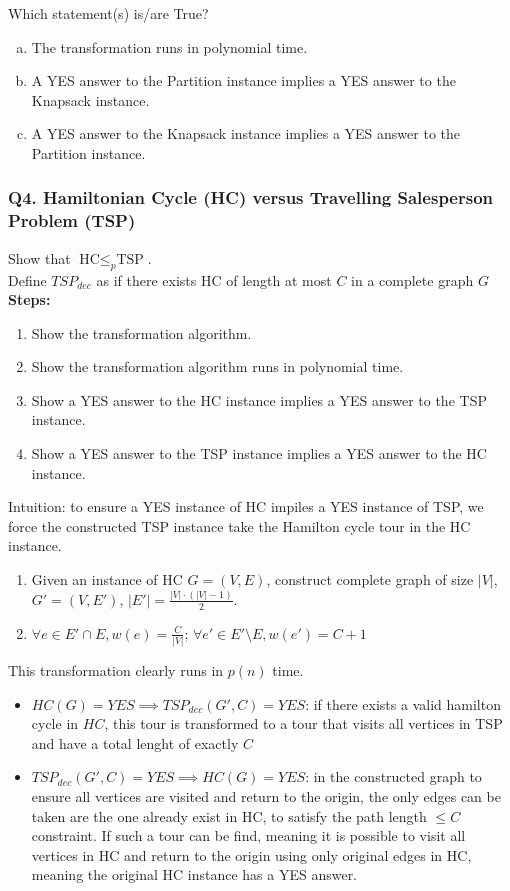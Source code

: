 \documentclass[9pt]{extarticle}
\begin{document}
Which statement(s) is/are True?
\begin{enumerate}[(a)]
    \item The transformation runs in polynomial time.
    \item A YES answer to the Partition instance implies a YES answer to the Knapsack instance.
    \item A YES answer to the Knapsack instance implies a YES answer to the Partition instance.
\end{enumerate}

\subsubsection{Q4. Hamiltonian Cycle (HC) versus Travelling Salesperson Problem (TSP)}
Show that \( \text{HC} \leq_p \text{TSP} \).\\
Define $TSP_{dec}$ as if there exists HC of length at most $C$ in a complete graph $G$\\
\textbf{Steps:}
\begin{enumerate}
    \item Show the transformation algorithm.
    \item Show the transformation algorithm runs in polynomial time.
    \item Show a YES answer to the HC instance implies a YES answer to the TSP instance.
    \item Show a YES answer to the TSP instance implies a YES answer to the HC instance.
\end{enumerate}
Intuition: to ensure a YES instance of HC impiles a YES instance of TSP, we force the constructed TSP instance take the Hamilton cycle tour in the HC instance. \\
\begin{enumerate}
  \item Given an instance of HC $G = (V, E)$, construct complete graph of size $|V|$, $G' = (V, E')$, $|E'| = \frac{|V|\cdot (|V|-1)}{2}$.
  \item $\forall e \in E' \cap E, w(e) = \frac{C}{|V|}$; $\forall e' \in E' \setminus E, w(e') = C + 1$  
\end{enumerate}
This transformation clearly runs in $p(n)$ time.\\
\begin{itemize}
  \item $HC(G) = YES \implies TSP_{dec}(G', C) = YES$: if there exists a valid hamilton cycle in $HC$, this tour is transformed to a tour that visits all vertices in TSP and have a total lenght of exactly $C$
  \item $ TSP_{dec}(G', C) = YES\implies HC(G) = YES$: in the constructed graph to ensure all vertices are visited and return to the origin, the only edges can be taken are the one already exist in HC, to satisfy the path length $\leq C$ constraint.
  If such a tour can be find, meaning it is possible to visit all vertices in HC and return to the origin using only original edges in HC, meaning the original HC instance has a YES answer.
\end{itemize}
\end{document}
